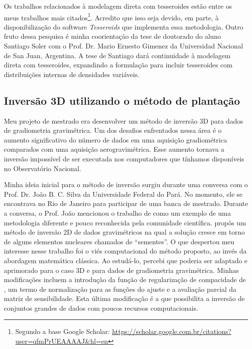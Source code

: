 Os trabalhos relacionados à modelagem direta com tesseroides estão entre os
meus trabalhos mais citados\footnote{Segundo a base Google Scholar:
\url{https://scholar.google.com.br/citations?user=qfmPrUEAAAAJ&hl=en}}.
Acredito que isso seja devido, em parte, à disponibilização do software
\textit{Tesseroids} que implementa essa metodologia.
Outro fruto dessa pesquisa é minha coorientação da tese de doutorado do aluno
Santiago Soler com o Prof. Dr. Mario Ernesto Gimenez da Universidad Nacional de
San Juan, Argentina.
A tese de Santiago dará continuidade à modelagem direta com tesseroides,
expandindo a formulação para incluir tesseroides com distribuições internas de
densidades variáveis.


\subsection{Inversão 3D utilizando o método de plantação}

Meu projeto de mestrado era desenvolver um método de inversão 3D para dados de
gradiometria gravimétrica.
Um dos desafios enfrentados nessa área é o aumento significativo do número de
dados em uma aquisição gradiométrica comparados com uma aquisição
aerogravimétrica.
Esse aumento tornava a inversão impossível de ser executada nos computadores
que tínhamos disponíveis no Observatório Nacional.

Minha ideia inicial para o método de inversão surgiu durante uma conversa com o
Prof. Dr. João B. C. Silva da Universidade Federal do Pará.
No momento, ele se encontrava no Rio de Janeiro para participar de uma banca de
mestrado.
Durante a conversa, o Prof. João mencionou o trabalho de \citet{rene} como um
exemplo de uma metodologia diferente e pouco reconhecida pela comunidade
científica.
\citet{rene} propôs um método de inversão 2D de dados gravimétricos na qual a
solução cresce em torno de alguns elementos nucleares chamados de ``sementes''.
O que despertou meu interesse nesse trabalho foi o viés computacional do método
proposto, ao invés da abordagem matemática clássica.
Ao estudá-lo, percebi que poderia ser adaptado e aprimorado para o
caso 3D e para dados de gradiometria gravimétrica.
Minhas modificações incluem a introdução da função de regularização de
compacidade de \citet{silvadias2009},
um termo de normalização para as funções do ajuste
e a avaliação parcial da matriz de sensibilidade.
Esta última modificação é a que possibilita a inversão de conjuntos grandes de
dados com poucos recursos computacionais.

